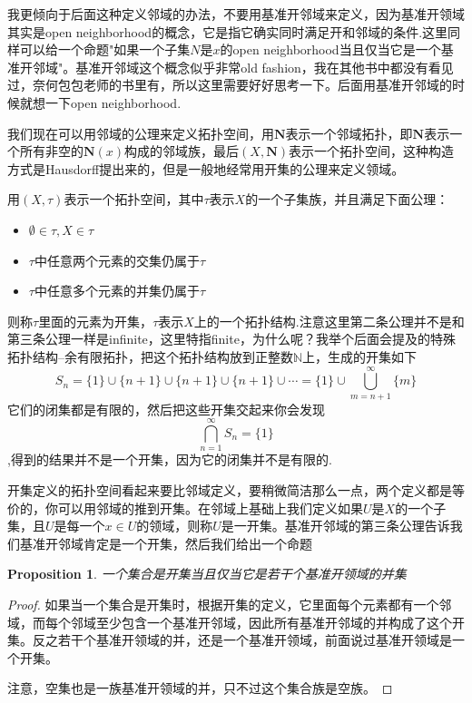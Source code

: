 \documentclass{article}
\newtheorem{proposition}[theorem]{Proposition}
\begin{document}
我更倾向于后面这种定义邻域的办法，不要用基准开邻域来定义，因为基准开领域其实是open neighborhood的概念，它是指它确实同时满足开和邻域的条件.这里同样可以给一个命题"如果一个子集$N$是$x$的open neighborhood当且仅当它是一个基准开邻域"。基准开邻域这个概念似乎非常old fashion，我在其他书中都没有看见过，奈何包包老师的书里有，所以这里需要好好思考一下。后面用基准开邻域的时候就想一下open neighborhood.

我们现在可以用邻域的公理来定义拓扑空间，用$\mathbf{N}$表示一个邻域拓扑，即$\mathbf{N}$表示一个所有非空的$\mathbf{N}(x)$构成的邻域族，最后$(X,\mathbf{N})$表示一个拓扑空间，这种构造方式是Hausdorff提出来的，但是一般地经常用开集的公理来定义领域。

用$(X,\tau)$表示一个拓扑空间，其中$\tau$表示$X$的一个子集族，并且满足下面公理：
\begin{itemize}
	\item $\emptyset \in \tau,X \in \tau$
	\item $\tau$中任意两个元素的交集仍属于$\tau$
	\item $\tau$中任意多个元素的并集仍属于$\tau$
\end{itemize}	
则称$\tau$里面的元素为开集，$\tau$表示$X$上的一个拓扑结构.注意这里第二条公理并不是和第三条公理一样是infinite，这里特指finite，为什么呢？我举个后面会提及的特殊拓扑结构--余有限拓扑，把这个拓扑结构放到正整数$\mathbb{N}$上，生成的开集如下\[S_n=\{1\} \cup \{n+1\} \cup \{n+1\} \cup \{n+1\} \cup \cdots = \{1\} \cup \bigcup\limits_{m=n+1}^{\infty}\{m\}  \]它们的闭集都是有限的，然后把这些开集交起来你会发现\[\bigcap\limits_{n=1}^{\infty} S_n = \{1\}\],得到的结果并不是一个开集，因为它的闭集并不是有限的.

开集定义的拓扑空间看起来要比邻域定义，要稍微简洁那么一点，两个定义都是等价的，你可以用邻域的推到开集。在邻域上基础上我们定义如果$U$是$X$的一个子集，且$U$是每一个$x \in U$的领域，则称$U$是一开集。基准开邻域的第三条公理告诉我们基准开邻域肯定是一个开集，然后我们给出一个命题

\begin{proposition}
一个集合是开集当且仅当它是若干个基准开领域的并集
\end{proposition}

\begin{proof}
如果当一个集合是开集时，根据开集的定义，它里面每个元素都有一个邻域，而每个邻域至少包含一个基准开邻域，因此所有基准开邻域的并构成了这个开集。反之若干个基准开领域的并，还是一个基准开领域，前面说过基准开领域是一个开集。

注意，空集也是一族基准开领域的并，只不过这个集合族是空族。
\end{proof}
\end{document}
